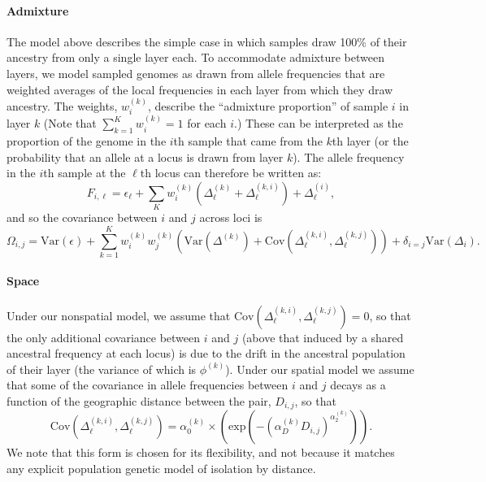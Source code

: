 \documentclass[10pt,letterpaper]{article}
\begin{document}
\paragraph{Admixture} 
The model above describes the simple case 
in which samples draw 100\% of their ancestry from only a single layer each. 
To accommodate admixture between layers, 
we model sampled genomes as drawn from
allele frequencies that are weighted averages of the local frequencies in each layer
from which they draw ancestry.
The weights, $w^{(k)}_{i}$, describe the
``admixture proportion'' of sample $i$ in layer $k$
(Note that $\sum_{k=1}^K w^{(k)}_{i} = 1$ for each $i$.)
These can be interpreted as the proportion of the genome in the $i$th
sample that came from the $k$th layer 
(or the probability that an allele at a locus is drawn from layer $k$).
The allele frequency in the $i$th sample at the $\ell$th locus can therefore be written as:
\begin{equation}
F_{i,\ell} = \epsilon_{\ell} + \sum\limits_{K} w^{(k)}_{i}\left( 
  \Delta^{(k)}_{\ell} + \Delta^{(k,i)}_{\ell}\right) + \Delta^{(i)}_{\ell}	 ,
\label{drift_terms_admix}
\end{equation}
and so the covariance between $i$ and $j$ across loci is
\begin{equation}
\Omega_{i,j} = \text{Var}(\epsilon) + \sum_{k=1}^K w^{(k)}_iw^{(k)}_j
\left(
  \text{Var}\left( \Delta^{(k)} \right) +
\text{Cov}(\Delta^{(k,i)}_{\ell},\Delta^{(k,j)}_{\ell}) 	\right) +
\delta_{i=j} \text{Var}(\Delta_i) .
\label{admixed_spatial_cov}
\end{equation}

\paragraph{Space}
Under our nonspatial model, 
we assume that $\text{Cov}(\Delta^{(k,i)}_{\ell},\Delta^{(k,j)}_{\ell})=0$,
so that the only additional covariance between $i$ and $j$ 
(above that induced by a shared ancestral frequency at each locus)
is due to the drift in the ancestral population of their layer 
(the variance of which is $\phi^{(k)}$). 
Under our spatial model we assume that some of the covariance in allele frequencies
between $i$ and $j$ decays as a function of the geographic distance
between the pair, $D_{i,j}$,
so that 
\begin{equation}
\text{Cov}(\Delta^{(k,i)}_{\ell},\Delta^{(k,j)}_{\ell}) = \alpha^{(k)}_0 \times \left(\text{exp} \left(  -(\alpha^{(k)}_D D_{i,j})^{\alpha^{(k)}_2}\right) \right) .
\end{equation}
We note that this form is chosen for its flexibility, 
and not because it matches any explicit population genetic model of isolation by distance. 
\end{document}
